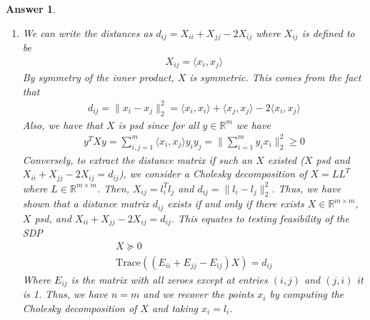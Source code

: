 \documentclass[12pt]{article}
\theoremstyle{colon}
\newtheorem*{answer}{Answer}
\begin{document}
\begin{answer}
  \leavevmode
  \begin{enumerate}[label=\arabic*)]
    \item We can write the distances as $d_{ij} = X_{ii} + X_{jj} - 2X_{ij}$ where $X_{ij}$ is defined to be
      \begin{gather*}
        X_{ij} = \langle x_i, x_j \rangle
      \end{gather*}
      By symmetry of the inner product, $X$ is symmetric. This comes from the fact that
      \begin{gather*}
        d_{ij} = \lVert x_i - x_j \rVert_2^2 = \langle x_i, x_i \rangle + \langle x_j, x_j \rangle - 2 \langle x_i, x_j \rangle
      \end{gather*}
      Also, we have that $X$ is psd since for all $y \in \mathbb{R}^m$ we have
      \begin{gather*}
        y^T X y = \sum_{i,j = 1}^m \langle x_i, x_j \rangle y_i y_j = \lVert \sum_{i=1}^m y_i x_i \rVert_2^2 \geq 0
      \end{gather*}
      Conversely, to extract the distance matrix if such an $X$ existed ($X$ psd and $X_{ii} + X_{jj} - 2X_{ij} = d_{ij}$), we consider a Cholesky decomposition of $X = L L^T$ where $L \in \mathbb{R}^{m \times m}$. Then, $X_{ij} = l_i^T l_j$ and $d_{ij} = \lVert l_i - l_j \rVert_2^2$. Thus, we have shown that a distance matrix $d_{ij}$ exists if and only if there exists $X \in \mathbb{R}^{m \times m}$, $X$ psd, and $X_{ii} + X_{jj} - 2X_{ij} = d_{ij}$. This equates to testing feasibility of the SDP
      \begin{gather*}
        X \succeq 0 \\
        \text{Trace}((E_{ii} + E_{jj} - E_{ij}) X) = d_{ij}
      \end{gather*}
      Where $E_{ij}$ is the matrix with all zeroes except at entries $(i,j)$ and $(j,i)$ it is 1. Thus, we have $n = m$ and we recover the points $x_i$ by computing the Cholesky decomposition of $X$ and taking $x_i = l_i$.


\end{enumerate}
\end{answer}
\end{document}

